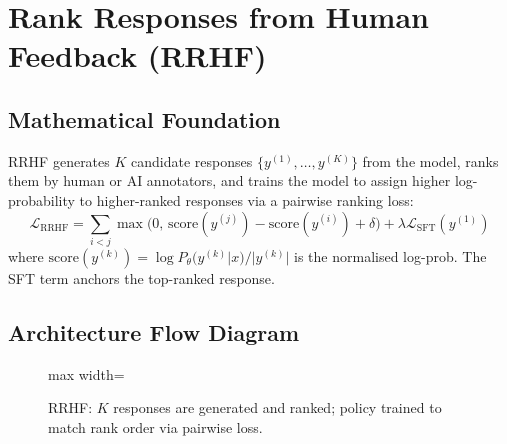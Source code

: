 \documentclass{article}
\begin{document}
\section{Rank Responses from Human Feedback (RRHF)}

\subsection{Mathematical Foundation}
RRHF generates $K$ candidate responses $\{y^{(1)}, \ldots, y^{(K)}\}$ from the model, ranks them by human or AI annotators, and trains the model to assign higher log-probability to higher-ranked responses via a pairwise ranking loss:
\begin{equation}
  \mathcal{L}_{\text{RRHF}} = \sum_{i < j}\max\!\bigl(0,\, \text{score}(y^{(j)}) - \text{score}(y^{(i)}) + \delta\bigr) + \lambda \mathcal{L}_{\text{SFT}}(y^{(1)})
\end{equation}
where $\text{score}(y^{(k)}) = \log P_\theta(y^{(k)}|x)/|y^{(k)}|$ is the normalised log-prob. The SFT term anchors the top-ranked response.

\subsection{Architecture Flow Diagram}

\begin{figure}[h]
\centering
\begin{adjustbox}{max width=\linewidth}
\end{adjustbox}
\caption{RRHF: $K$ responses are generated and ranked; policy trained to match rank order via pairwise loss.}
\end{figure}
\end{document}
